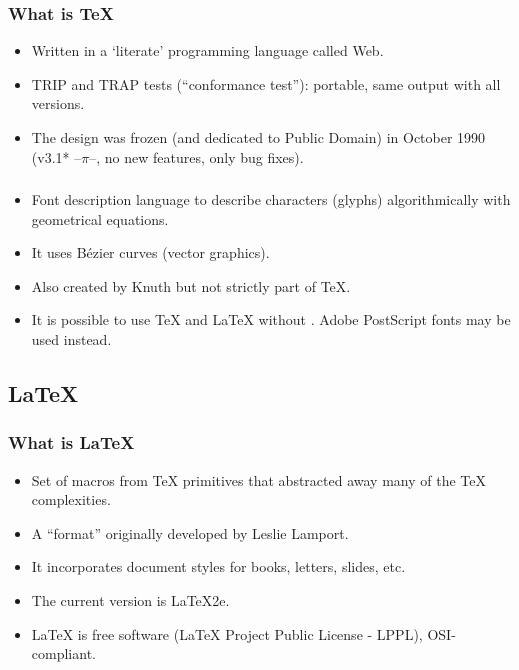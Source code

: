 \documentclass{beamer}
\begin{document}

\begin{frame}
\frametitle{What is \TeX}

\begin{itemize}
\item Written in a `literate' programming language called Web.
\item TRIP and TRAP tests (``conformance test''): portable, same output with all versions. 
\item The design was frozen (and dedicated to Public Domain) in October 1990 (v3.1* --$\pi$--, no new features, only bug fixes).
\end{itemize}

\end{frame}




\begin{frame}[fragile] 
\frametitle{\MF}

\begin{itemize}
\item Font description language to describe characters (glyphs) algorithmically with geometrical equations.
\item It uses Bézier curves (vector graphics). 
\item Also created by Knuth but not strictly part of \TeX.
\item It is possible to use \TeX{} and \LaTeX{} without \MF. Adobe PostScript fonts may be used instead.
\end{itemize}

\end{frame}

\subsection{\LaTeX}

\begin{frame}
\frametitle{What is \LaTeX}

\begin{itemize}
\item \alert{Set of macros} from \TeX{} primitives that abstracted away many of the \TeX{} complexities.
\item A ``format'' originally developed by Leslie Lamport.
\item It incorporates document styles for books, letters, slides, etc. 
\item The current version is \LaTeX2e.
\item \LaTeX{} is free software (LaTeX Project Public License - LPPL), OSI-compliant.
\end{itemize}

\end{frame}
\end{document}
